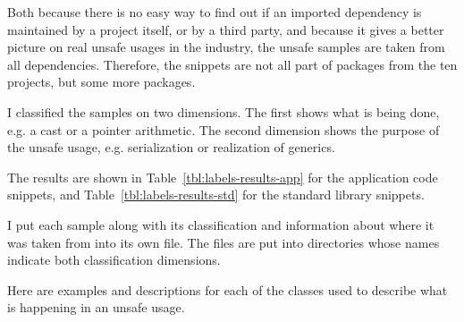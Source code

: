 Both because there is no easy way to find out if an imported dependency is maintained by a project itself, or by a
third party, and because it gives a better picture on real unsafe usages in the industry, the unsafe samples are taken
from all dependencies.
Therefore, the snippets are not all part of packages from the ten projects, but some more packages.

I classified the samples on two dimensions.
The first shows what is being done, e.g. a cast or a pointer arithmetic.
The second dimension shows the purpose of the unsafe usage, e.g. serialization or realization of generics.

The results are shown in Table~\ref{tbl:labels-results-app} for the application code snippets, and
Table~\ref{tbl:labels-results-std} for the standard library snippets.



I put each sample along with its classification and information about where it was taken from into its own file.
The files are put into directories whose names indicate both classification dimensions.

Here are examples and descriptions for each of the classes used to describe what is happening in an unsafe usage.





